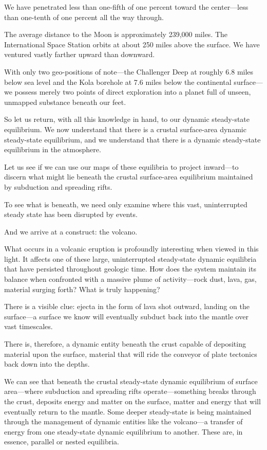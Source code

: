 We have penetrated less than one-fifth of one percent toward the center—less than one-tenth of one percent all the way through.

The average distance to the Moon is approximately 239,000 miles. The International Space Station orbits at about 250 miles above the surface. We have ventured vastly farther upward than downward.

With only two geo-positions of note—the Challenger Deep at roughly 6.8 miles below sea level and the Kola borehole at 7.6 miles below the continental surface—we possess merely two points of direct exploration into a planet full of unseen, unmapped substance beneath our feet.

So let us return, with all this knowledge in hand, to our dynamic steady-state equilibrium. We now understand that there is a crustal surface-area dynamic steady-state equilibrium, and we understand that there is a dynamic steady-state equilibrium in the atmosphere.

Let us see if we can use our maps of these equilibria to project inward—to discern what might lie beneath the crustal surface-area equilibrium maintained by subduction and spreading rifts.

To see what is beneath, we need only examine where this vast, uninterrupted steady state has been disrupted by events.

And we arrive at a construct: the volcano.

What occurs in a volcanic eruption is profoundly interesting when viewed in this light. It affects one of these large, uninterrupted steady-state dynamic equilibria that have persisted throughout geologic time. How does the system maintain its balance when confronted with a massive plume of activity—rock dust, lava, gas, material surging forth? What is truly happening?

There is a visible clue: ejecta in the form of lava shot outward, landing on the surface—a surface we know will eventually subduct back into the mantle over vast timescales.

There is, therefore, a dynamic entity beneath the crust capable of depositing material upon the surface, material that will ride the conveyor of plate tectonics back down into the depths.

We can see that beneath the crustal steady-state dynamic equilibrium of surface area—where subduction and spreading rifts operate—something breaks through the crust, deposits energy and matter on the surface, matter and energy that will eventually return to the mantle. Some deeper steady-state is being maintained through the management of dynamic entities like the volcano—a transfer of energy from one steady-state dynamic equilibrium to another. These are, in essence, parallel or nested equilibria.

